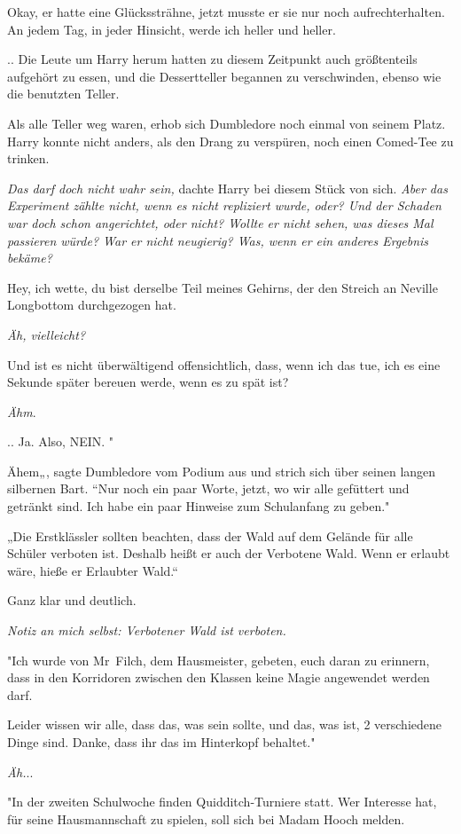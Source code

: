 {Okay, er hatte eine Glückssträhne, jetzt musste er sie nur noch aufrechterhalten. An jedem Tag, in jeder Hinsicht, werde ich heller und heller.

.. Die Leute um Harry herum hatten zu diesem Zeitpunkt auch größtenteils aufgehört zu essen, und die Dessertteller begannen zu verschwinden, ebenso wie die benutzten Teller.

Als alle Teller weg waren, erhob sich Dumbledore noch einmal von seinem Platz. Harry konnte nicht anders, als den Drang zu verspüren, noch einen Comed-Tee zu trinken.

\emph{Das darf doch nicht wahr sein,} dachte Harry bei diesem Stück von sich. \emph{Aber das Experiment zählte nicht, wenn es nicht repliziert wurde, oder? Und der Schaden war doch schon angerichtet, oder nicht? Wollte er nicht sehen, was dieses Mal passieren würde? War er nicht neugierig? Was, wenn er ein anderes Ergebnis bekäme?}

Hey, ich wette, du bist derselbe Teil meines Gehirns, der den Streich an Neville Longbottom durchgezogen hat.

\emph{Äh, vielleicht?}

Und ist es nicht überwältigend offensichtlich, dass, wenn ich das tue, ich es eine Sekunde später bereuen werde, wenn es zu spät ist?

\emph{Ähm}.

.. Ja. Also, NEIN. "

Ähem„, sagte Dumbledore vom Podium aus und strich sich über seinen langen silbernen Bart. “Nur noch ein paar Worte, jetzt, wo wir alle gefüttert und getränkt sind. Ich habe ein paar Hinweise zum Schulanfang zu geben."

„Die Erstklässler sollten beachten, dass der Wald auf dem Gelände für alle Schüler verboten ist. Deshalb heißt er auch der Verbotene Wald. Wenn er erlaubt wäre, hieße er Erlaubter Wald.“

Ganz klar und deutlich.

\emph{Notiz an mich selbst: Verbotener Wald ist verboten.}

"Ich wurde von Mr~Filch, dem Hausmeister, gebeten, euch daran zu erinnern, dass in den Korridoren zwischen den Klassen keine Magie angewendet werden darf.

Leider wissen wir alle, dass das, was sein sollte, und das, was ist, 2 verschiedene Dinge sind. Danke, dass ihr das im Hinterkopf behaltet."

\emph{Äh.}..

"In der zweiten Schulwoche finden Quidditch-Turniere statt. Wer Interesse hat, für seine Hausmannschaft zu spielen, soll sich bei Madam Hooch melden.

}
